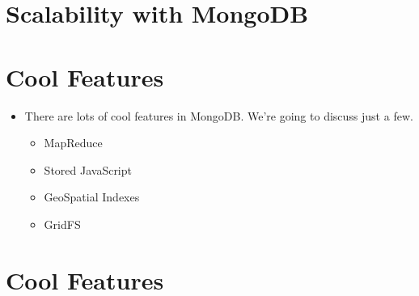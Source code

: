 \documentclass[xcolor=dvipsnames]{beamer}
\newenvironment{itemizeframe}
               {\begin{frame}\startitemizeframe} 
               {\stopitemizeframe\end{frame}}
\newcommand\startitemizeframe{\begin{itemize}} \newcommand\stopitemizeframe{\end{itemize}}
\begin{document}
\section{Scalability with MongoDB}
\section{Cool Features}

\begin{itemizeframe}
        \frametitle{Cool Features?}
        \item There are lots of cool features in MongoDB.  We're going to discuss just a few.
            \begin{itemize}
                \item MapReduce
                \item Stored JavaScript 
                \item GeoSpatial Indexes
                \item GridFS
            \end{itemize}
\end{itemizeframe}

\section{Cool Features}
\end{document}
